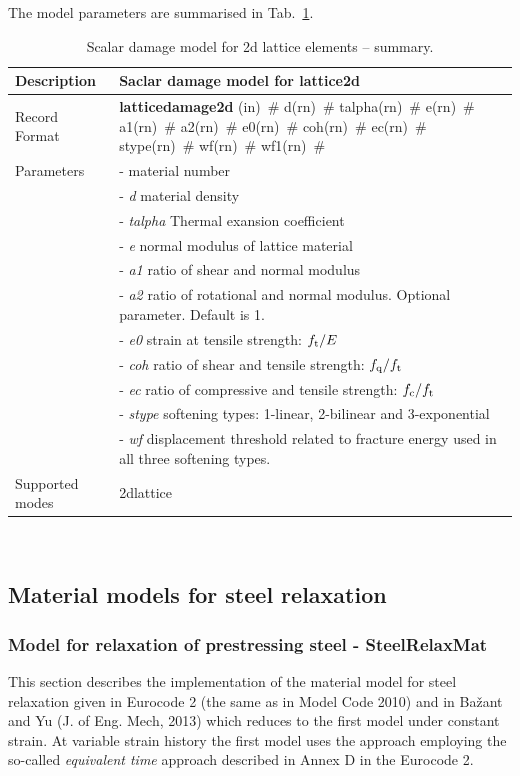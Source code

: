 \documentclass[a4paper]{article}
\newcommand{\descitem}[1]{{\noindent \bf #1}}
\newcommand{\elemparam}[2]{{{#1\tiny (#2)}~\#}}
\newcommand{\param}[1]{{\it #1}}
\newenvironment{mmt}{\begin{tabular}{|l|p{9cm}|}}{\end{tabular}\\}
\newenvironment{mmt}{\begin{tabular}{|l|l|}}{\end{tabular}\\}
\begin{document}
The model parameters are summarised in Tab.~\ref{latticedamage2d_table}.
\begin{table}[!htb]
\begin{mmt}
\hline
Description & Saclar damage model for lattice2d \\
\hline
Record Format & \descitem{latticedamage2d} \elemparam{}{in} 
\elemparam{d}{rn} \elemparam{talpha}{rn} \elemparam{e}{rn} \elemparam{a1}{rn} \elemparam{a2}{rn} \elemparam{e0}{rn}  \elemparam{coh}{rn} \elemparam{ec}{rn} \elemparam{stype}{rn} \elemparam{wf}{rn} \elemparam{wf1}{rn} \\
Parameters &- \param{} material number\\
&- \param{d} material density\\
&- \param{talpha} Thermal exansion coefficient\\
&- \param{e} normal modulus of lattice material\\
&- \param{a1} ratio of shear and normal modulus\\
&- \param{a2} ratio of rotational and normal modulus. Optional parameter. Default is 1.\\
&- \param{e0} strain at tensile strength: $f_{\rm t}/E$\\
&- \param{coh} ratio of shear and tensile strength: $f_{\rm q}/f_{\rm t}$\\
&- \param{ec} ratio of compressive and tensile strength: $f_{\rm c}/f_{\rm t}$\\
&- \param{stype} softening types: 1-linear, 2-bilinear and 3-exponential\\
&- \param{wf} displacement threshold related to fracture energy used in all three softening types.\\

Supported modes& 2dlattice\\
\hline
\end{mmt}
\caption{Scalar damage model for 2d lattice elements -- summary.}
\label{latticedamage2d_table}
\end{table}


\subsection{Material models for steel relaxation}

\subsubsection{Model for relaxation of prestressing steel - SteelRelaxMat}
This section describes the implementation of the material model for
steel relaxation given in Eurocode 2 (the same as in Model Code 2010)
and in Ba\v{z}ant and Yu (J. of Eng. Mech, 2013) which reduces to the first model under
constant strain. At variable strain history the first model uses the
approach employing the so-called {\sl{equivalent time}} approach
described in Annex D in the Eurocode 2.
\end{document}
